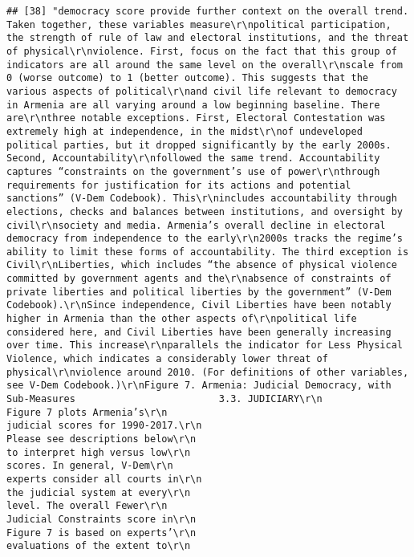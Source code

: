 \documentclass[
]{article}
\begin{document}
\begin{verbatim}
## [38] "democracy score provide further context on the overall trend. Taken together, these variables measure\r\npolitical participation, the strength of rule of law and electoral institutions, and the threat of physical\r\nviolence. First, focus on the fact that this group of indicators are all around the same level on the overall\r\nscale from 0 (worse outcome) to 1 (better outcome). This suggests that the various aspects of political\r\nand civil life relevant to democracy in Armenia are all varying around a low beginning baseline. There are\r\nthree notable exceptions. First, Electoral Contestation was extremely high at independence, in the midst\r\nof undeveloped political parties, but it dropped significantly by the early 2000s. Second, Accountability\r\nfollowed the same trend. Accountability captures “constraints on the government’s use of power\r\nthrough requirements for justification for its actions and potential sanctions” (V-Dem Codebook). This\r\nincludes accountability through elections, checks and balances between institutions, and oversight by civil\r\nsociety and media. Armenia’s overall decline in electoral democracy from independence to the early\r\n2000s tracks the regime’s ability to limit these forms of accountability. The third exception is Civil\r\nLiberties, which includes “the absence of physical violence committed by government agents and the\r\nabsence of constraints of private liberties and political liberties by the government” (V-Dem Codebook).\r\nSince independence, Civil Liberties have been notably higher in Armenia than the other aspects of\r\npolitical life considered here, and Civil Liberties have been generally increasing over time. This increase\r\nparallels the indicator for Less Physical Violence, which indicates a considerably lower threat of physical\r\nviolence around 2010. (For definitions of other variables, see V-Dem Codebook.)\r\nFigure 7. Armenia: Judicial Democracy, with Sub-Measures                         3.3. JUDICIARY\r\n                                                                                 Figure 7 plots Armenia’s\r\n                                                                                 judicial scores for 1990-2017.\r\n                                                                                 Please see descriptions below\r\n                                                                                 to interpret high versus low\r\n                                                                                 scores. In general, V-Dem\r\n                                                                                 experts consider all courts in\r\n                                                                                 the judicial system at every\r\n                                                                                 level. The overall Fewer\r\n                                                                                 Judicial Constraints score in\r\n                                                                                 Figure 7 is based on experts’\r\n                                                                                 evaluations of the extent to\r\n                                                                      
\end{verbatim}
\end{document}
